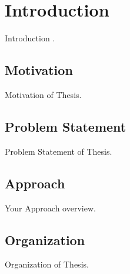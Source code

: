 \chapter{Introduction} 
\label{chapter:introduction}

Introduction \cite{sample_ref}.

\section{Motivation} 
\label{sec:motivation}

Motivation of Thesis.

\section{Problem Statement} 
\label{sec:problemStatement}

Problem Statement of Thesis.

\section{Approach}
 \label{sec:approach}

Your Approach overview.

\section{Organization}
 \label{sec:organization}

Organization of Thesis.
